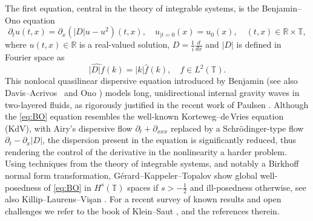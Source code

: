 \documentclass [11pt] {article}
\begin{document}
The first equation, central in the theory of integrable systems, is the Benjamin--Ono equation
\begin{equation}
\label{eq:BO}\tag{BO}
\partial_t u(t,x) = \partial_x \left( |D| u - u^2 \right)(t,x), \quad  u_{|t=0}(x)= u_{0}(x), \quad (t,x) \in \mathbb{R} \times \mathbb{T}, 
\end{equation}
\renewcommand*{\theHequation}{notag.\theequation}%
where $u(t,x)\in \mathbb{R}$ is a real-valued solution, $D = \frac{1}{i}\frac{d}{dx}$ and $|D|$ is defined in Fourier space as
\[
\widehat{|D|f}(k) = |k|\widehat{f}(k), \quad f\in L^2(\mathbb T).
\]
This nonlocal quasilinear dispersive equation introduced by Benjamin \cite{BO} (see also Davis--Acrivos~\cite{DA67} and Ono \cite{Ono}) models long, unidirectional internal gravity waves in two-layered fluids, as rigorously justified in the recent work of Paulsen \cite{P24}. Although the \eqref{eq:BO} equation resembles the well-known Korteweg--de\,Vries equation (KdV), with Airy's dispersive flow $\partial_t+\partial_{xxx}$ replaced by a Schr\"odinger-type flow $\partial_t - \partial_x  |D|$, the dispersion present in the equation is significantly reduced, thus rendering the control of the derivative in the nonlinearity a harder problem. 
Using techniques from the theory of integrable systems, and notably a Birkhoff normal form transformation, Gérard--Kappeler--Topalov \cite{GKT} show global well-posedness of \eqref{eq:BO} in $H^s(\mathbb{T})$ spaces if $s>-\frac{1}{2}$ and ill-posedness otherwise, see also Killip--Laurens--Vi\c san \cite{KLV24}. For a recent survey of known results and open challenges we refer to the book of Klein--Saut \cite[Chapter 3]{KS21}, and the references therein.
\newline
\end{document}
